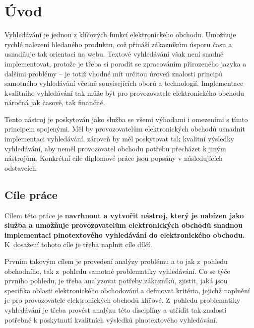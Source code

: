 \documentclass[FM,DP]{tulthesis}
\begin{document}
\setcounter{page}{2}
\tableofcontents
\clearpage

\listoffigures
\clearpage

\listoftables
\clearpage

\listoflistings
\clearpage


\chapter{Úvod}

Vyhledávání  je jednou z klíčových funkcí elektronického obchodu. Umožňuje rychlé nalezení
hledaného produktu, což přináší zákazníkům úsporu času a usnadňuje tak orientaci na webu.
Textové vyhledávání však není snadné implementovat, protože je třeba si poradit se zpracováním
přirozeného jazyka a dalšími problémy -- je totiž vhodné mít určitou úroveň znalosti principů samotného 
vyhledávání včetně souvisejících oborů a technologií. Implementace kvalitního vyhledávání
tak může být pro provozovatele elektronického obchodu náročná jak časově, tak finančně.

Tento nástroj je poskytován jako služba se všemi výhodami i omezeními s tímto principem spojenými. 
Měl by provozovatelům elektronických obchodů usnadnit implementaci vyhledávání, zároveň
by měl poskytovat tak kvalitní výsledky vyhledávání, aby neměl provozovatel obchodu potřebu
přecházet k jiným nástrojům. Konkrétní cíle diplomové práce jsou popsány v následujících odstavcích.

\section{Cíle práce}

Cílem této práce je \textbf{navrhnout a vytvořit nástroj, který je nabízen jako služba a umožňuje 
provozovatelům elektronických obchodů snadnou implementaci plnotextového vyhledávání do elektronického 
obchodu.} K~dosažení tohoto cíle je třeba naplnit cíle dílčí.

Prvním takovým cílem je provedení analýzy problému a to jak z~pohledu obchodního, tak
z~pohledu samotné problematiky vyhledávání. Co se týče prvního pohledu, je třeba
analyzovat potřeby zákazníků, zjistit, jaká jsou specifika oblasti elektronického obchodování
a definovat kritéria, jejichž naplnění je pro provozovatele elektronických obchodů klíčové. 
Z~pohledu problematiky vyhledávání je třeba provést analýzu této disciplíny a utřídit
tak znalosti potřebné k poskytnutí kvalitních výsledků plnotextového vyhledávání.
\end{document}
